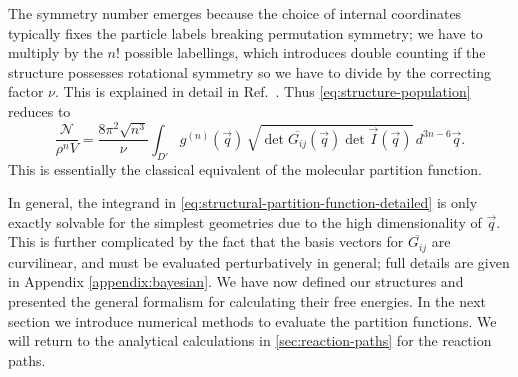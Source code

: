 \documentclass[11pt,twoside]{report}
\begin{document}
The symmetry number emerges because the choice of internal coordinates typically fixes the particle labels breaking permutation symmetry; we have to multiply by the $n!$ possible labellings, which introduces double counting if the structure possesses rotational symmetry so we have to divide by the correcting factor $\nu$.
This is explained in detail in Ref.\ \cite{CatesSM2015}.
Thus \eqref{eq:structure-population} reduces to%
\begin{equation}\label{eq:structural-partition-function-detailed}
  \frac{\mathcal{N}}{\rho^n V}
  =
  \frac{8\pi^2 \sqrt{n^3}}{\nu} \int_{D'}
  g^{(n)}(\vec{q}) \,
  \sqrt{\det{\overline{G_{ij}}(\vec{q})} \det{\vec{I}(\vec{q})}}
  \, d^{3n-6} \vec{q}.
\end{equation}
This is essentially the classical equivalent of the molecular partition function.

In general, the integrand in \eqref{eq:structural-partition-function-detailed} is only exactly solvable for the simplest geometries due to the high dimensionality of $\vec{q}$.
This is further complicated by the fact that the basis vectors for $\overline{G_{ij}}$ are curvilinear, and must be evaluated perturbatively in general; full details are given in Appendix \ref{appendix:bayesian}.
We have now defined our structures and presented the general formalism for calculating their free energies.
In the next section we introduce numerical methods to evaluate the partition functions.
We will return to the analytical calculations in \ref{sec:reaction-paths} for the reaction paths.

\end{document}
